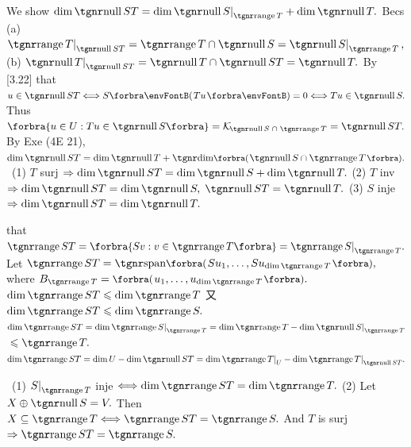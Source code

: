 We show $\dim \null ST=\dim \null S\mmid_{\range T} + \dim \null T.$\parSol{}
Becs (a) \uline{$\range T\mmid_{\null ST}=\range T\cap\null S=\null S\mmid_{\range T}\,,$}\parSol{}
 (b) \uline{$\null T\mmid_{\null ST}=\null T\cap\null ST=\null T.$} By [3.22]\PfEnd\parSol{\vspace{6pt}}
\Or \NOTICE that \uline{$u\in\null ST\Longleftrightarrow S\Par{Tu}=0\Longleftrightarrow Tu\in\null S.$}\parSol{}
\Blind{\Or}Thus \uline{$\Bra{u\in U:Tu\in\null S}=\mathcal{K}_{\!\null S\;\cap\;\range T}=\null ST.$}\parSol{}
\Blind{\Or}By Exe (4E 21), $\dim\null ST=\dim\null T+\Dim\BigPar{\null S\cap\range T}.$\PfEnd\vspace{4pt}
\Corollary \,\,\,(1) $T$ surj $\Rightarrow\dim\null ST=\dim\null S+\dim\null T.$\parCor
(2) $T$ inv $\Rightarrow\dim\null ST=\dim\null S,\;\null ST=\null T.$\parCor
(3) $S$ inje $\Rightarrow\dim\null ST=\dim\null T.$\vspace{-3pt}
\SepLine

\NOTICE that \uline{$\range ST=\Bra{Sv:v\in\range T}=\range S\mmid_{\range T}.$}\parSol{}
Let $\range ST=\Span[\BigPar]{Su_1,\dots,Su_{\dim\range T}},$ where $B_{\range T}=\BigPar{u_1,\dots,u_{\dim\range T}}.$\parSol{}
$\dim\range ST\leqslant \dim\range T$
又 $\dim\range ST\leqslant \dim\range S.$\PfEnd\parSol{\vspace{4pt}}
\Or \uline{$\dim\range ST=\dim\range S\mmid_{\range T}=\dim\range T-\dim\null S\mmid_{\range T}$}${}\leqslant \range T.$\PfEnd\parSol{}
\Comment \,\,\,$\dim\range ST=\dim U-\dim\null ST=\dim \range T\mmid_{U}-\dim\range T\mmid_{\null ST}.$\par\vspace{4pt}
\Corollary \,\,\,(1) $S\mmid_{\range T}$ inje $\Longleftrightarrow\dim\range ST=\dim\range T.$\parCor
(2) Let $X\oplus\null S=V.$ Then $X\subseteq\range T\Longleftrightarrow\range ST=\range S.$\vspace{-2pt}\parCor
{} And $T$ is surj $\Rightarrow\range ST=\range S.$
\SepLine

